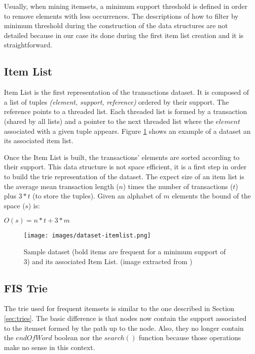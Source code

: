 \documentclass[a4paper,10pt,table,xcdraw]{article}
\begin{document}
Usually, when mining itemsets, a minimum support threshold is defined in order to remove elements with less occurrences. The descriptions of how to filter by minimum threshold during the construction of the data structures are not detailed because in our case its done during the first item list creation and it is straightforward.



\subsection{Item List}

Item List is the first representation of the transactions dataset. It is composed of a list of tuples \textit{(element, support, reference)} ordered by their support. The reference points to a threaded list. Each threaded list is formed by a transaction (shared by all lists) and a pointer to the next threaded list where the $element$ associated with a given tuple appears. Figure \ref{fig:dataset} shows an example of a dataset an its associated item list.

Once the Item List is built, the transactions' elements are sorted according to their support. This data structure is not space efficient, it is a first step in order to build the trie representation of the dataset. The expect size of an item list is the average mean transaction length ($n$) times the number of transactions ($t$) plus $3*t$ (to store the tuples). Given an alphabet of $m$ elements the bound of the space ($s$) is:

$O(s) = n * t + 3 * m$

\begin{figure}[h]
\centering
\texttt{[image: images/dataset-itemlist.png]}
\caption{Sample dataset (bold items are frequent for a minimum support of 3) and its associated Item List. (image extracted from \cite{Pietracaprina2003})  }
\label{fig:dataset}
\end{figure}



\subsection{FIS Trie}



The trie used for frequent itemsets is similar to the one described in Section \ref{sec:tries}. The basic difference is that nodes now contain the support associated to the itemset formed by the path up to the node. Also, they no longer contain the $endOfWord$ boolean nor the $search()$ function because those operations make no sense in this context. 
\end{document}

